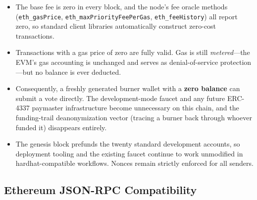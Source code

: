 \begin{itemize}
    \item The base fee is zero in every block, and the node's fee oracle methods (\texttt{eth\_gasPrice}, \texttt{eth\_maxPriorityFeePerGas}, \texttt{eth\_feeHistory}) all report zero, so standard client libraries automatically construct zero-cost transactions.
    \item Transactions with a gas price of zero are fully valid. Gas is still \emph{metered}---the EVM's gas accounting is unchanged and serves as denial-of-service protection---but no balance is ever deducted.
    \item Consequently, a freshly generated burner wallet with a \textbf{zero balance} can submit a vote directly. The development-mode faucet and any future ERC-4337 paymaster infrastructure become unnecessary on this chain, and the funding-trail deanonymization vector (tracing a burner back through whoever funded it) disappears entirely.
    \item The genesis block prefunds the twenty standard development accounts, so deployment tooling and the existing faucet continue to work unmodified in hardhat-compatible workflows. Nonces remain strictly enforced for all senders.
\end{itemize}

\subsection{Ethereum JSON-RPC Compatibility}

